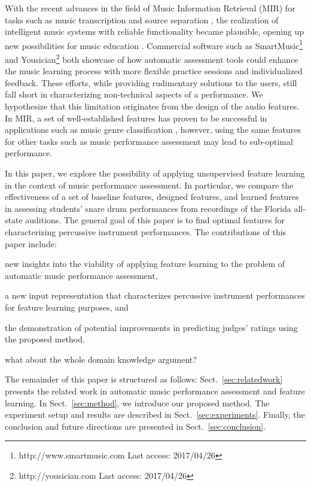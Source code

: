 \documentclass{article}
\begin{document}
With the recent advances in the field of Music Information Retrieval (MIR) for tasks such as music transcription \cite{Benetos2013} and source separation \cite{Huang2014}, the realization of intelligent music systems with reliable functionality became plausible, opening up new possibilities for music education \cite{Dittmar2012}. Commercial software such as SmartMusic\footnote{http://www.smartmusic.com Last access: 2017/04/26} and Yousician\footnote{http://yousician.com Last access: 2017/04/26} both showcase of how automatic assessment tools could enhance the music learning process with more flexible practice sessions and individualized feedback. These efforts, while providing rudimentary solutions to the users, still fall short in characterizing non-technical aspects of a performance. We hypothesize that this limitation originates from the design of the audio features. In MIR, a set of well-established features has proven to be successful in applications such as music genre classification \cite{Tzanetakis2002}, however, using the same features for other tasks such as music performance assessment may lead to sub-optimal performance. %

In this paper, we explore the possibility of applying unsupervised feature learning in the context of music performance assessment. In particular, we compare the effectiveness of a set of baseline features, designed features, and learned features in assessing students' snare drum performances from recordings of the Florida all-state auditions. The general goal of this paper is to find optimal features for characterizing percussive instrument performances. The contributions of this paper include:
\begin{inparaenum}[(i)]
	\item   new insights into the viability of applying feature learning to the problem of automatic music performance assessment, 
    \item   a new input representation that characterizes percussive instrument performances for feature learning purposes, and 
    \item   the demonstration of potential improvements in predicting judges' ratings using the proposed method.
    \item   {\color{red}what about the whole domain knowledge argument?}
\end{inparaenum} 

The remainder of this paper is structured as follows: Sect.~\ref{sec:relatedwork} presents the related work in automatic music performance assessment and feature learning. In Sect.~\ref{sec:method}, we introduce our proposed method. The experiment setup and results are described in Sect.~\ref{sec:experiments}. Finally, the conclusion and future directions are presented in Sect.~\ref{sec:conclusion}.
\end{document}

